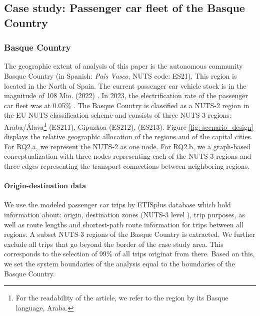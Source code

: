 \subsection{Case study: Passenger car fleet of the Basque Country}
       \subsubsection{Basque Country}

        The geographic extent of  analysis of this paper is the autonomous community Basque Country (in Spanish: \textit{País Vasco}, NUTS code: ES21). This region is located in the North of Spain. The current passenger car vehicle stock is in the magnitude of 108 Mio. (2022) \citep{eurostat_transport2024}. In 2023, the electrification rate of the passenger car fleet was at 0.05\% \citep{eurostat_zev_2024}. The Basque Country is classified as a NUTS-2 region in the EU NUTS classification scheme \citep{eurostat_nuts} and consists of three NUTS-3 regions: Araba/Álava\footnote{For the readability of the article, we refer to the region by its Basque language, Araba.} (ES211), Gipuzkoa (ES212),  (ES213). Figure \ref{fig: scenario_design} displays the relative geographic allocation of the regions and of the capital cities. For RQ2.a, we represent the NUTS-2 as one node.
        For RQ2.b, we  a graph-based conceptualization with three nodes representing each of the NUTS-3 regions and three edges representing the transport connections between neighboring regions.    

 

            \paragraph*{Origin-destination data}
            We use the modeled passenger car trips by ETISplus data\deleted{ }base \citep{ETISplus_233596} which hold information about: origin, destination zones (NUTS-3 level \citep{eurostat_nuts}), trip purposes, as well as route lengths and shortest-path route information for trips between all regions. 
            A subset  NUTS-3 regions of the Basque Country is extracted. We further exclude all trips that go beyond the border of the case study area. This corresponds to the selection of 99\% of all trips originat from there. Based on this, we set the system boundaries of the analysis equal to the boundaries of the Basque Country.

